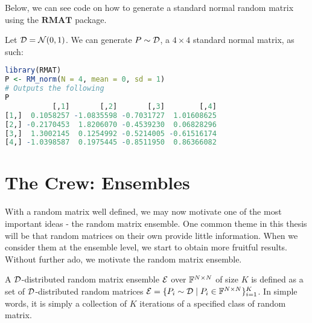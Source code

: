 \medskip
\noindent Below, we can see code on how to generate a standard normal random matrix using the $\textbf{RMAT}$ package.
\begin{code}
Let $\mathcal{D} = \mathcal{N}(0,1)$. We can generate $P \sim \mathcal{D}$, a $4 \times 4$ standard normal matrix, as such:
\end{code}

\begin{lstlisting}[language=R]
library(RMAT)
P <- RM_norm(N = 4, mean = 0, sd = 1)
# Outputs the following
P
           [,1]       [,2]       [,3]        [,4]
[1,]  0.1058257 -1.0835598 -0.7031727  1.01608625
[2,] -0.2170453  1.8206070 -0.4539230  0.06828296
[3,]  1.3002145  0.1254992 -0.5214005 -0.61516174
[4,] -1.0398587  0.1975445 -0.8511950  0.86366082
\end{lstlisting}

\begin{center}
  \Ddisttable
\end{center}
\newpage


\section{The Crew: Ensembles}

With a random matrix well defined, we may now motivate one of the most important ideas - the random matrix ensemble. One common theme in this thesis will be that random matrices on their own provide little information. When we consider them at the ensemble level, we start to obtain more fruitful results. Without further ado, we motivate the random matrix ensemble.

\begin{definition}
A $\mathcal{D}$-distributed random matrix ensemble $\mathcal{E}$ over $\mathbb{F}^{N \times N}$ of size $K$ is defined as a set of $\mathcal{D}$-distributed random matrices $\mathcal{E} = \{P_i \sim \mathcal{D} \mid P_i \in \mathbb{F}^{N \times N}\}_{i = 1}^K$. In simple words, it is simply a collection of $K$ iterations of a specified class of random matrix.
\end{definition}

